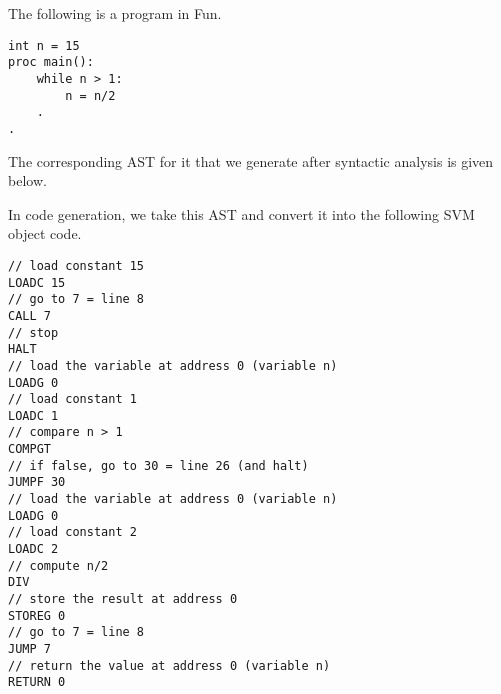 \documentclass[a4paper, openany]{memoir}
\begin{document}
The following is a program in Fun.
\begin{lstlisting}[language=Fun]
int n = 15
proc main():
    while n > 1:
        n = n/2
    .
.
\end{lstlisting}
The corresponding AST for it that we generate after syntactic analysis is given below.
\begin{figure}[H]
    \centering
\end{figure}
\noindent In code generation, we take this AST and convert it into the following SVM object code.
\begin{lstlisting}[language=SVM]
// load constant 15
LOADC 15
// go to 7 = line 8
CALL 7
// stop
HALT
// load the variable at address 0 (variable n)
LOADG 0
// load constant 1
LOADC 1
// compare n > 1
COMPGT
// if false, go to 30 = line 26 (and halt)
JUMPF 30
// load the variable at address 0 (variable n)
LOADG 0
// load constant 2
LOADC 2
// compute n/2
DIV
// store the result at address 0
STOREG 0
// go to 7 = line 8
JUMP 7
// return the value at address 0 (variable n)
RETURN 0
\end{lstlisting}
\end{document}

